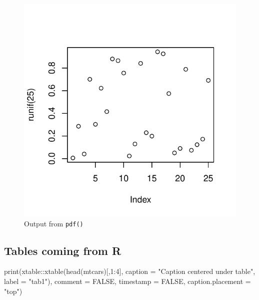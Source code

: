 \documentclass[useAMS,usenatbib,referee]{biom}
\newenvironment{Shaded}{\begin{snugshade}}{\end{snugshade}}
\newcommand{\AttributeTok}[1]{\textcolor[rgb]{0.77,0.63,0.00}{#1}}
\newcommand{\ConstantTok}[1]{\textcolor[rgb]{0.00,0.00,0.00}{#1}}
\newcommand{\DecValTok}[1]{\textcolor[rgb]{0.00,0.00,0.81}{#1}}
\newcommand{\FunctionTok}[1]{\textcolor[rgb]{0.00,0.00,0.00}{#1}}
\newcommand{\NormalTok}[1]{#1}
\newcommand{\SpecialCharTok}[1]{\textcolor[rgb]{0.00,0.00,0.00}{#1}}
\newcommand{\StringTok}[1]{\textcolor[rgb]{0.31,0.60,0.02}{#1}}
\begin{document}
\begin{figure}
\centering
\includegraphics{final-project_files/figure-latex/fig2-1.pdf}
\caption{Output from \texttt{pdf()}}
\end{figure}

\clearpage

\hypertarget{tables-coming-from-r}{%
\subsection{Tables coming from R}\label{tables-coming-from-r}}

\begin{Shaded}
\begin{Highlighting}[]
\FunctionTok{print}\NormalTok{(xtable}\SpecialCharTok{::}\FunctionTok{xtable}\NormalTok{(}\FunctionTok{head}\NormalTok{(mtcars)[,}\DecValTok{1}\SpecialCharTok{:}\DecValTok{4}\NormalTok{], }
\AttributeTok{caption =} \StringTok{"Caption centered under table"}\NormalTok{, }\AttributeTok{label =} \StringTok{"tab1"}\NormalTok{), }
\AttributeTok{comment =} \ConstantTok{FALSE}\NormalTok{, }\AttributeTok{timestamp =} \ConstantTok{FALSE}\NormalTok{, }\AttributeTok{caption.placement =} \StringTok{"top"}\NormalTok{)}
\end{Highlighting}
\end{Shaded}
\end{document}
